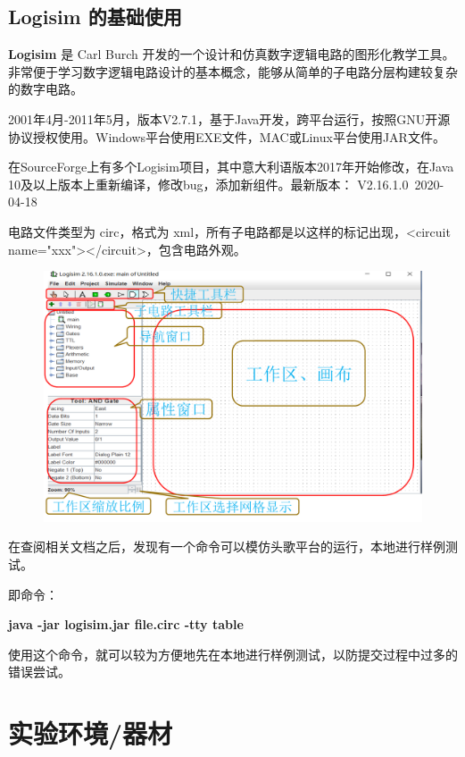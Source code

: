 \documentclass[UTF8]{ctexart}
\begin{document}
\subsection{Logisim 的基础使用}

\textbf{Logisim} 是 Carl Burch 开发的一个设计和仿真数字逻辑电路的图形化教学工具。非常便于学习数字逻辑电路设计的基本概念，能够从简单的子电路分层构建较复杂的数字电路。

2001年4月-2011年5月，版本V2.7.1，基于Java开发，跨平台运行，按照GNU开源协议授权使用。Windows平台使用EXE文件，MAC或Linux平台使用JAR文件。

在SourceForge上有多个Logisim项目，其中意大利语版本2017年开始修改，在Java 10及以上版本上重新编译，修改bug，添加新组件。最新版本： V2.16.1.0 2020-04-18

电路文件类型为 circ，格式为 xml，所有子电路都是以这样的标记出现，<circuit name="xxx"></circuit>，包含电路外观。

\begin{figure}[H]
    \centering
    \includegraphics[width = \textwidth]{images/logisim.png}
\end{figure}

在查阅相关文档之后，发现有一个命令可以模仿头歌平台的运行，本地进行样例测试。

即命令：

\begin{center}
    \textbf{java -jar logisim.jar file.circ -tty table}
\end{center}

使用这个命令，就可以较为方便地先在本地进行样例测试，以防提交过程中过多的错误尝试。


\section{实验环境/器材}
\end{document}
